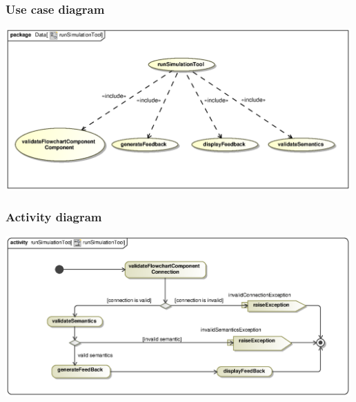 \documentclass[11pt,a4paper,titlepage]{article}
\begin{document}
\subsubsection{Use case diagram}
\includegraphics[width=500px]{runSimulationToolUseCase.eps}

\subsubsection{Activity diagram}
\includegraphics[width=500px]{runSimulationToolActivity.eps}
\end{document}
